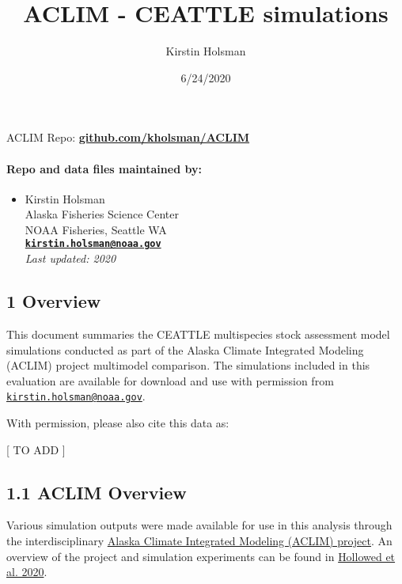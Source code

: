 \documentclass[]{article}
\title{ACLIM - CEATTLE simulations}
\author{Kirstin Holsman}
\date{6/24/2020}
\providecommand{\tightlist}{%
  \setlength{\itemsep}{0pt}\setlength{\parskip}{0pt}}
\let\oldparagraph\paragraph
\renewcommand{\paragraph}[1]{\oldparagraph{#1}\mbox{}}
\begin{document}
\maketitle

ACLIM Repo:
\href{https://github.com/kholsman/ACLIM}{\textbf{github.com/kholsman/ACLIM}}

\paragraph{Repo and data files maintained
by:}\label{repo-and-data-files-maintained-by}

\begin{itemize}
\tightlist
\item
  Kirstin Holsman\\
  Alaska Fisheries Science Center\\
  NOAA Fisheries, Seattle WA\\
  \textbf{\href{mailto:kirstin.holsman@noaa.gov}{\nolinkurl{kirstin.holsman@noaa.gov}}}\\
  \emph{Last updated: 2020}
\end{itemize}

\subsection{1 Overview}\label{overview}

This document summaries the CEATTLE multispecies stock assessment model
simulations conducted as part of the Alaska Climate Integrated Modeling
(ACLIM) project multimodel comparison. The simulations included in this
evaluation are available for download and use with permission from
\href{mailto:kirstin.holsman@noaa.gov}{\nolinkurl{kirstin.holsman@noaa.gov}}.

With permission, please also cite this data as:

{[} TO ADD {]}

\subsection{1.1 ACLIM Overview}\label{aclim-overview}

Various simulation outputs were made available for use in this analysis
through the interdisciplinary
\href{\%22https://www.fisheries.noaa.gov/alaska/ecosystems/alaska-climate-integrated-modeling-project\%22}{Alaska
Climate Integrated Modeling (ACLIM) project}. An overview of the project
and simulation experiments can be found in
\href{\%22https://www.frontiersin.org/articles/10.3389/fmars.2019.00775/full\%22}{Hollowed
et al. 2020}.
\end{document}
